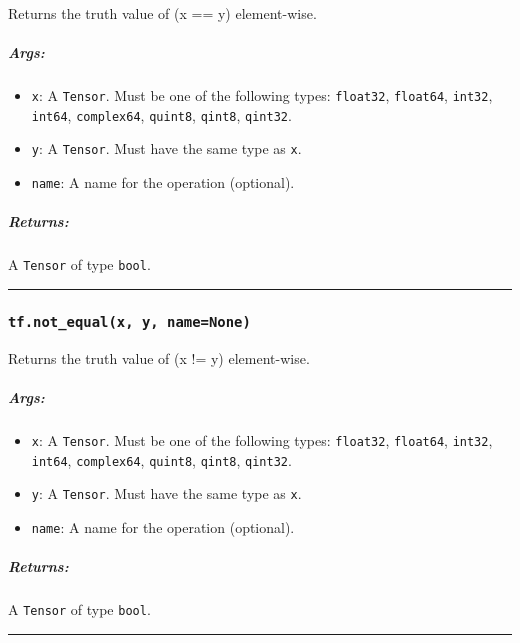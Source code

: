 Returns the truth value of (x == y) element-wise.

\subparagraph{Args: }\label{args-8}

\begin{itemize}
\tightlist
\item
  \texttt{x}: A \texttt{Tensor}. Must be one of the following types:
  \texttt{float32}, \texttt{float64}, \texttt{int32}, \texttt{int64},
  \texttt{complex64}, \texttt{quint8}, \texttt{qint8}, \texttt{qint32}.
\item
  \texttt{y}: A \texttt{Tensor}. Must have the same type as \texttt{x}.
\item
  \texttt{name}: A name for the operation (optional).
\end{itemize}

\subparagraph{Returns: }\label{returns-8}

A \texttt{Tensor} of type \texttt{bool}.

\begin{center}\rule{0.5\linewidth}{\linethickness}\end{center}

\subsubsection{\texorpdfstring{\texttt{tf.not\_equal(x,\ y,\ name=None)}
}{tf.not\_equal(x, y, name=None) }}\label{tf.notux5fequalx-y-namenone}

Returns the truth value of (x != y) element-wise.

\subparagraph{Args: }\label{args-9}

\begin{itemize}
\tightlist
\item
  \texttt{x}: A \texttt{Tensor}. Must be one of the following types:
  \texttt{float32}, \texttt{float64}, \texttt{int32}, \texttt{int64},
  \texttt{complex64}, \texttt{quint8}, \texttt{qint8}, \texttt{qint32}.
\item
  \texttt{y}: A \texttt{Tensor}. Must have the same type as \texttt{x}.
\item
  \texttt{name}: A name for the operation (optional).
\end{itemize}

\subparagraph{Returns: }\label{returns-9}

A \texttt{Tensor} of type \texttt{bool}.

\begin{center}\rule{0.5\linewidth}{\linethickness}\end{center}

